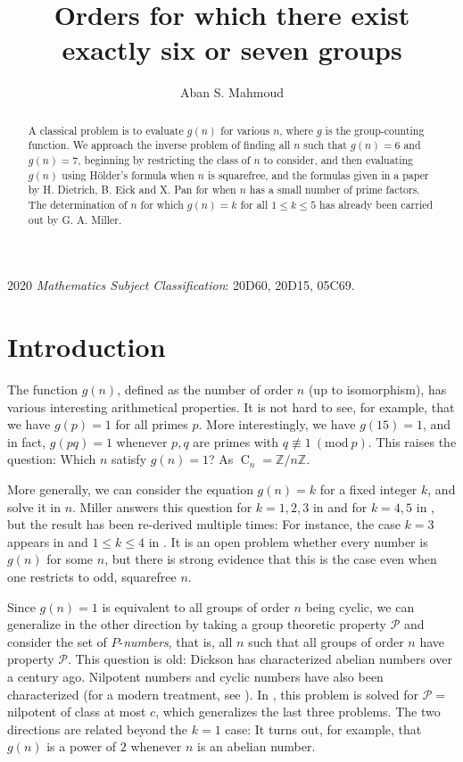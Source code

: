 \documentclass{article}
\newcommand{\cyc}[1]{\operatorname{C}_{#1}}
\newcommand{\Mod}[1]{\ (\mathrm{mod} \ #1)}
\theoremstyle{plain}
\theoremstyle{definition}
\begin{document}
\title{Orders for which there exist exactly six or seven groups}
\author{Aban S. Mahmoud}
\maketitle

\setlength{\abovedisplayskip}{2.8pt}
\setlength{\belowdisplayskip}{2.5pt}

\begin{abstract}
	A classical problem is to evaluate $g(n)$ for various $n$, where $g$ is the group-counting function. We approach the inverse problem of finding all $n$ such that $g(n) = 6$ and $g(n) = 7$, beginning by restricting the class of $n$ to consider, and then evaluating $g(n)$ using Hölder's formula when $n$ is squarefree, and the formulas given in a paper by H. Dietrich, B. Eick and X. Pan for when $n$ has a small number of prime factors. The determination of $n$ for which $g(n) = k$ for all $1 \le k \le 5$ has already been carried out by G. A. Miller.
\end{abstract}

\textup{2020} \textit{Mathematics Subject Classification}: \textup{20D60, 20D15, 05C69}.

\section{Introduction}
The function $g(n)$, defined as the number of order $n$ (up to isomorphism), has various interesting arithmetical properties. It is not hard to see, for example, that we have $g(p) = 1$ for all primes $p$. More interestingly, we have $g(15) = 1$, and in fact, $g(pq) = 1$ whenever $p, q$ are primes with $q \not\equiv 1 \Mod{p}$. This raises the question: Which $n$ satisfy $g(n) = 1$? As $\cyc{n} = \mathbb{Z}/n\mathbb{Z}$. 

More generally, we can consider the equation $g(n) = k$ for a fixed integer $k$, and solve it in $n$. Miller answers this question for $k = 1, 2, 3$ in {\cite{miller1}} and for $k = 4, 5$ in {\cite{miller2}}, but the result has been re-derived multiple times: For instance, the case $k = 3$ appears in {\cite{olsson}} and $1 \le k \le 4$ in {\cite{gnumoas}}. It is an open problem whether every number is $g(n)$ for some $n$, but there is strong evidence that this is the case even when one restricts to odd, squarefree $n$. 

Since $g(n) = 1$ is equivalent to all groups of order $n$ being cyclic, we can generalize in the other direction by taking a group theoretic property $\mathcal{P}$ and consider the set of $P$-\emph{numbers}, that is, all $n$ such that all groups of order $n$ have property $\mathcal{P}$. This question is old: Dickson {\cite{dickson}} has characterized abelian numbers over a century ago. Nilpotent numbers {\cite{pazderski}} and cyclic numbers {\cite{szele}} have also been characterized (for a modern treatment, see {\cite{nilnumb}}). In {\cite{mueller}}, this problem is solved for $\mathcal{P} = $ nilpotent of class at most $c$, which generalizes the last three problems. The two directions are related beyond the $k = 1$ case: It turns out, for example, that $g(n)$ is a power of $2$ whenever $n$ is an abelian number.
\end{document}
